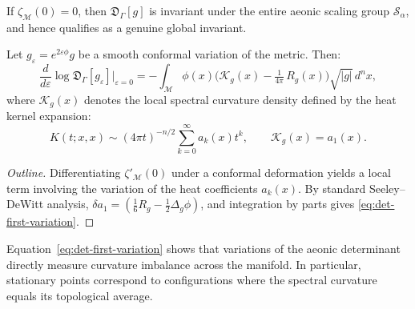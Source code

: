 \begin{corollary}
If \(\zeta_{\mathcal{M}}(0)=0\),
then \(\mathfrak{D}_\Gamma[g]\)
is invariant under the entire aeonic scaling group \(\mathcal{S}_\alpha\),
and hence qualifies as a genuine global invariant.
\end{corollary}


\begin{theorem}
\label{thm:det-variation}
Let \(g_\varepsilon = e^{2\varepsilon\phi}g\)
be a smooth conformal variation of the metric.
Then:
\begin{equation}
\label{eq:det-first-variation}
\frac{d}{d\varepsilon}\log\mathfrak{D}_\Gamma[g_\varepsilon]\Big|_{\varepsilon=0}
=
-\int_{\mathcal{M}}
\phi(x)
\Big(
\mathcal{K}_g(x) - \tfrac{1}{4\pi}\,R_g(x)
\Big)
\sqrt{|g|}\,d^nx,
\end{equation}
where \(\mathcal{K}_g(x)\)
denotes the local spectral curvature density defined by the heat kernel expansion:
\[
K(t;x,x)
\sim
(4\pi t)^{-n/2}
\sum_{k=0}^{\infty}
a_k(x)t^k,
\qquad
\mathcal{K}_g(x)=a_1(x).
\]
\end{theorem}

\begin{proof}[Outline]
Differentiating \(\zeta'_{\mathcal{M}}(0)\)
under a conformal deformation
yields a local term involving
the variation of the heat coefficients \(a_k(x)\).
By standard Seeley–DeWitt analysis,
\(\delta a_1 = (\frac{1}{6}R_g - \frac{1}{2}\Delta_g\phi)\),
and integration by parts gives \eqref{eq:det-first-variation}.
\end{proof}

\begin{remark}[Interpretation]
Equation~\eqref{eq:det-first-variation}
shows that variations of the aeonic determinant
directly measure curvature imbalance across the manifold.
In particular, stationary points correspond to configurations
where the spectral curvature equals its topological average.
\end{remark}


